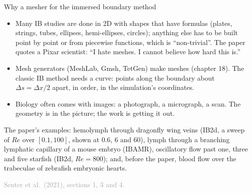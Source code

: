 \documentclass[aspectratio=169,11pt]{beamer}
\newcommand{\sourcecredit}[1]{\vfill\hfill{\tiny\textcolor{DarkGray}{#1}}}
\begin{document}
\begin{frame}{Why a mesher for the immersed boundary method}
\label{fr:why}
\small
\begin{itemize}
  \item Many IB studies are done in 2D with shapes that have formulas (plates, strings, tubes, ellipses, hemi-ellipses, circles); anything else has to be built point by point or from piecewise functions, which is ``non-trivial''. The paper quotes a Pixar scientist: ``I hate meshes. I cannot believe how hard this is.''
  \item Mesh generators (MeshLab, Gmsh, TetGen) make  meshes (chapter 18). The classic IB method needs a  curve: points along the boundary about $\Delta s = \Delta x/2$ apart, in order, in the simulation's coordinates.
  \item Biology often comes with images: a photograph, a micrograph, a scan. The geometry is in the picture; the work is getting it out.
\end{itemize}
\begin{punchbox}
\small The paper's examples: hemolymph through dragonfly wing veins (IB2d, a sweep of $Re$ over $[0.1, 100]$, shown at 0.6, 6 and 60), lymph through a branching lymphatic capillary of a mouse embryo (IBAMR), oscillatory flow past one, three and five starfish (IB2d, $Re = 800$); and, before the paper, blood flow over the trabeculae of zebrafish embryonic hearts.
\end{punchbox}
\sourcecredit{Senter et al.\ (2021), sections 1, 3 and 4.}
\end{frame}
\end{document}

